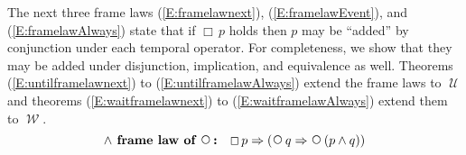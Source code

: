 \documentclass[12pt, fleqn, leqno]{article}
\newcommand{\lgap}{2pt}                             %
\newcommand{\mymathindent}{24pt}                    %
\newcommand{\equivs}{\ensuremath{\;\equiv\;}}       %
\newcommand{\impl}{\ensuremath{\Rightarrow}}        %
\newcommand{\foll}{\ensuremath{\Leftarrow}}         %
\newcommand{\Until}{\;\mathcal{U}\;}
\newcommand{\Wait}{\;\mathcal{W}\;}
\newcommand{\Next}{\;\,\text{\raisebox{3.5pt}{\circle{6}}}}
\newcommand{\Event}{\Diamond\,}
\newcommand{\Always}{\Box\,}
\newcommand{\myqed}{\rule[-.23ex]{1.2ex}{2.0ex}}
\newcommand{\myqedtab}{\hspace{384pt}}              %
\newcommand{\Gll} {\langle}                         %
\newcommand{\Ggg} {\rangle}                         %
\newcommand{\Hint}[1]     {\ \ \ $\Gll              \mbox{#1} \Ggg$ }   %
\begin{document}

The next three frame laws (\ref{E:framelawnext}), (\ref{E:framelawEvent}), and (\ref{E:framelawAlways}) state that if $\Always p$ holds then $p$ may be ``added'' by conjunction under each temporal operator. \cite{Kroger}
For completeness, we show that they may be added under disjunction, implication, and equivalence as well.
Theorems (\ref{E:untilframelawnext}) to (\ref{E:untilframelawAlways}) extend the frame laws to $\Until$ and theorems (\ref{E:waitframelawnext}) to (\ref{E:waitframelawAlways}) extend them to $\Wait$.
\begin{equation}\label{E:framelawnext}
\textbf{$\land$ frame law of $\Next$:}\quad \Always p \impl (\Next q \impl \Next (p \land q))
\end{equation}
\end{document}
